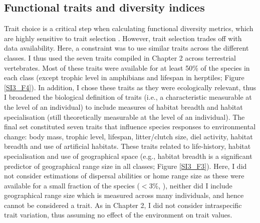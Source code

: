 \subsection{Functional traits and diversity indices}
Trait choice is a critical step when calculating functional diversity metrics, which are highly sensitive to trait selection \citep{Mouillot2021}. However, trait selection trades off with data availability. Here, a constraint was to use similar traits across the different classes. %
I thus used the seven traits compiled in Chapter 2 across terrestrial vertebrates. Most of these traits were available for at least 50\% of the species in each class (except trophic level in amphibians and lifespan in herptiles; Figure \ref{SI3_F4}). In addition, I chose these traits as they were ecologically relevant, thus I broadened the biological definition of traits (i.e., a characteristic measurable at the level of an individual) to include measures of habitat breadth and habitat specialisation (still theoretically measurable at the level of an individual). The final set constituted seven traits that influence species responses to environmental change: body mass, trophic level, lifespan, litter/clutch size, diel activity, habitat breadth and use of artificial habitats. These traits related to life-history, habitat specialisation and use of geographical space (e.g., habitat breadth is a significant predictor of geographical range size in all classes; Figure \ref{SI3_F3}). Here, I did not consider estimations of dispersal abilities or home range size as these were available for a small fraction of the species ($<$3\%, \cite{AlexSmith2005, Paradis1998, Sutherland2000, Whitmee2013a}), neither did I include geographical range size which is measured across many individuals, and hence cannot be considered a trait. As in Chapter 2, I did not consider intraspecific trait variation, thus assuming no effect of the environment on trait values.

